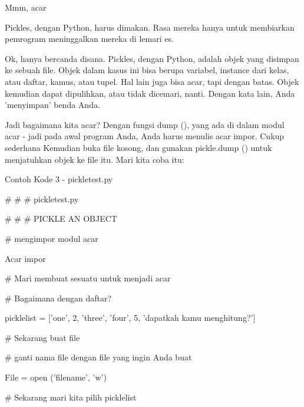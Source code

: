 \documentclass[a4paper,12pt]{report}
\begin{document}
\noindent 
Mmm, acar \par
\noindent 
\vspace{12pt}
\noindent 
Pickles, dengan Python, harus dimakan. Rasa mereka hanya untuk membiarkan pemrogram meninggalkan mereka di lemari es. \par
\noindent 
\vspace{12pt}
\noindent 
Ok, hanya bercanda disana. Pickles, dengan Python, adalah objek yang disimpan ke sebuah file. Objek dalam kasus ini bisa berupa variabel, instance dari kelas, atau daftar, kamus, atau tupel. Hal lain juga bisa acar, tapi dengan batas. Objek kemudian dapat dipulihkan, atau tidak dicemari, nanti. Dengan kata lain, Anda 'menyimpan' benda Anda. \par
\noindent 
\vspace{12pt}
\noindent 
Jadi bagaimana kita acar? Dengan fungsi dump (), yang ada di dalam modul acar - jadi pada awal program Anda, Anda harus menulis acar impor. Cukup sederhana Kemudian buka file kosong, dan gunakan pickle.dump () untuk menjatuhkan objek ke file itu. Mari kita coba itu: \par
\noindent 
Contoh Kode 3 - pickletest.py \par
\noindent 
\vspace{12pt}
\noindent 
 $  \#  $ $  \#  $ $  \#  $ pickletest.py \par
\noindent 
 $  \#  $ $  \#  $ $  \#  $ PICKLE AN OBJECT \par
\noindent 
\vspace{12pt}
\noindent 
 $  \#  $ mengimpor modul acar \par
\noindent 
Acar impor \par
\noindent 
\vspace{12pt}
\noindent 
 $  \#  $ Mari membuat sesuatu untuk menjadi acar \par
\noindent 
 $  \#  $ Bagaimana dengan daftar? \par
\noindent 
picklelist = ['one', 2, 'three', 'four', 5, 'dapatkah kamu menghitung?'] \par
\noindent 
\vspace{12pt}
\noindent 
 $  \#  $ Sekarang buat file \par
\noindent 
 $  \#  $ ganti nama file dengan file yang ingin Anda buat \par
\noindent 
File = open ('filename', 'w') \par
\noindent 
\vspace{12pt}
\noindent 
 $  \#  $ Sekarang mari kita pilih picklelist \par
\end{document}
